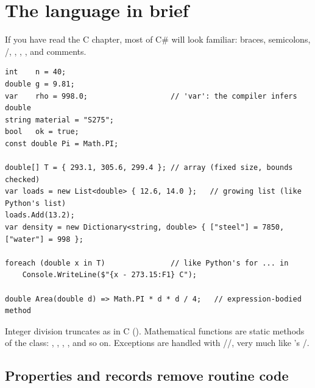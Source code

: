 \section{The language in brief}

If you have read the C chapter, most of C\# will look familiar: braces, semicolons,
/, , , , and \code{//} comments.
\begin{lstlisting}[language={[Sharp]C}]
int    n = 40;
double g = 9.81;
var    rho = 998.0;                   // 'var': the compiler infers double
string material = "S275";
bool   ok = true;
const double Pi = Math.PI;

double[] T = { 293.1, 305.6, 299.4 }; // array (fixed size, bounds checked)
var loads = new List<double> { 12.6, 14.0 };   // growing list (like Python's list)
loads.Add(13.2);
var density = new Dictionary<string, double> { ["steel"] = 7850, ["water"] = 998 };

foreach (double x in T)               // like Python's for ... in
    Console.WriteLine($"{x - 273.15:F1} C");

double Area(double d) => Math.PI * d * d / 4;   // expression-bodied method
\end{lstlisting}
Integer division truncates as in C (). Mathematical functions are static
methods of the  class: , , ,
,  and so on. Exceptions are handled with
//, very much like \py's /.

\subsection*{Properties and records remove routine code}

